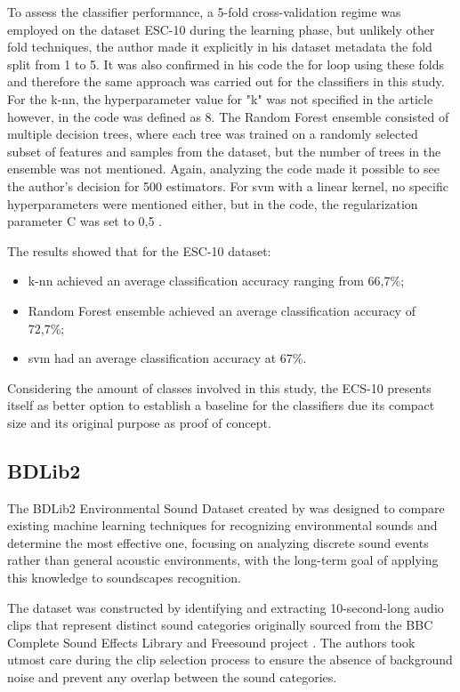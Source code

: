 To assess the classifier performance, a 5-fold cross-validation regime was employed on the dataset ESC-10 during the learning phase, but unlikely other fold techniques, the author made it explicitly in his dataset metadata the fold split from 1 to 5. It was also confirmed in his code the for loop using these folds and therefore the same approach was carried out for the classifiers in this study.
For the \gls{k-nn}, the hyperparameter value for "k" was not specified in the article however, in the code was defined as 8. The Random Forest ensemble consisted of multiple decision trees, where each tree was trained on a randomly selected subset of features and samples from the dataset, but the number of trees in the ensemble was not mentioned. Again, analyzing the code made it possible to see the author's decision for 500 estimators. For \gls{svm} with a linear kernel, no specific hyperparameters were mentioned either, but in the code, the regularization parameter C was set to 0,5 \cite{PiczakESC2015}.

The results showed that for the ESC-10 dataset: 
\begin{itemize}
    \item \gls{k-nn} achieved an average classification accuracy ranging from 66,7\%;
    \item Random Forest ensemble achieved an average classification accuracy of 72,7\%;
    \item \gls{svm} had an average classification accuracy at 67\%. 
\end{itemize}

Considering the amount of classes involved in this study, the ECS-10 presents itself as better option to establish a baseline for the classifiers due its compact size and its original purpose as proof of concept.

\subsection{BDLib2}
\label{subsec:dataset_BDLib2}

The BDLib2 Environmental Sound Dataset created by \textcite{Bountourakis2015} was designed to compare existing machine learning techniques for recognizing environmental sounds and determine the most effective one, focusing on analyzing discrete sound events rather than general acoustic environments, with the long-term goal of applying this knowledge to soundscapes recognition.

The dataset was constructed by identifying and extracting 10-second-long audio clips that represent distinct sound categories originally sourced from the BBC Complete Sound Effects Library \cite{BBC2023} and Freesound project \cite{Font_freesound2013}. The authors took utmost care during the clip selection process to ensure the absence of background noise and prevent any overlap between the sound categories.

